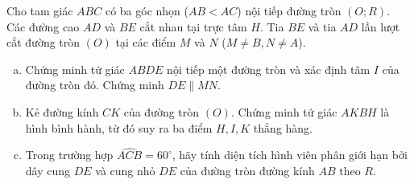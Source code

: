\begin{bt}%
Cho tam giác $ABC$ có ba góc nhọn ($AB < AC$) nội tiếp đường tròn $(O; R)$. Các đường cao $AD$ và $BE$ cắt nhau tại trực tâm $H$. Tia $BE$ và tia $AD$ lần lượt cắt đường tròn $(O)$ tại các điểm $M$ và $N$ ($M \neq B, N \neq A$).
\begin{enumerate}[a)]
	\item Chứng minh tứ giác $ABDE$ nội tiếp một đường tròn và xác định tâm $I$ của đường tròn đó. Chứng minh $DE \parallel MN$.
	\item Kẻ đường kính $CK$ của đường tròn $(O)$. Chứng minh tứ giác $AKBH$ là hình bình hành, từ đó suy ra ba điểm $H, I, K$ thẳng hàng.
	\item Trong trường hợp $\widehat{ACB} = 60^\circ$, hãy tính diện tích hình viên phân giới hạn bởi dây cung $DE$ và cung nhỏ $DE$ của đường tròn đường kính $AB$ theo $R$.
\end{enumerate}
\end{bt}
